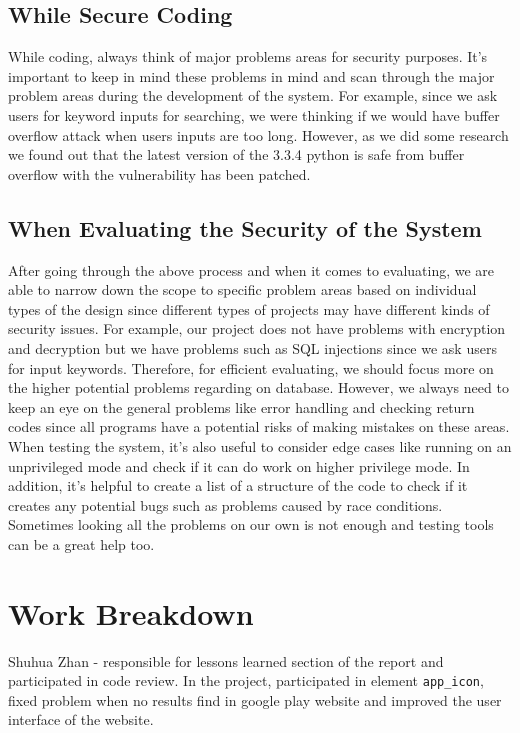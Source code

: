 \documentclass[12pt, a4paper]{article}
\newcommand{\code}[1]{\texttt{#1}}
\begin{document}
\subsection{While Secure Coding}
While coding, always think of major problems areas for security purposes. It’s important to keep in mind these problems in mind and scan through the major problem areas during the development of the system. For example, since we ask users for keyword inputs for searching, we were thinking if we would have buffer overflow attack when users inputs are too long. However, as we did some research we found out that the latest version of the 3.3.4 python is safe from buffer overflow with the vulnerability has been patched.
\subsection{When Evaluating the Security of the System}
After going through the above process and when it comes to evaluating, we are able to narrow down the scope to specific problem areas based on individual types of the design since different types of projects may have different kinds of security issues. For example, our project does not have problems with encryption and decryption but we have problems such as SQL injections since we ask users for input keywords. Therefore, for efficient evaluating, we should focus more on the higher potential problems regarding on database. However, we always need to keep an eye on the general problems like error handling and checking return codes since all programs have a potential risks of making mistakes on these areas. When testing the system, it's also useful to consider edge cases like running on an unprivileged mode and check if it can do work on higher privilege mode. In addition, it's helpful to create a list of a structure of the code to check if it creates any potential bugs such as problems caused by race conditions. Sometimes looking all the problems on our own is not enough and testing tools can be a great help too.
\section{Work Breakdown}
Shuhua Zhan - responsible for lessons learned section of the report and participated in code review. In the project, participated in element \code{app\_icon}, fixed problem when no results find in google play website and improved the user interface of the website.


\newcommand{\citeWeb}[3]{#1, \url{#2}, Retrieved #3.}
\end{document}
